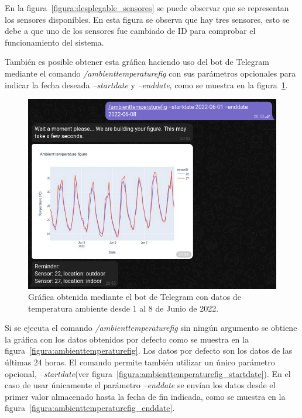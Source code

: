 \documentclass[a4paper, 12pt, oneside]{book}
\begin{document}
En la figura~\ref{figura:desplegable_sensores} se puede observar que se representan los sensores disponibles. En esta figura se observa que hay tres sensores, esto se debe a que uno de los sensores fue cambiado de ID para comprobar el funcionamiento del sistema.


También es posible obtener esta gráfica haciendo uso del bot de Telegram mediante el comando \textit{/ambienttemperaturefig} con sus parámetros opcionales para indicar la fecha deseada \textit{--startdate} y \textit{--enddate}, como se muestra en la figura~\ref{figura:telegram_ambient_temperature_01_08_junio}.
\begin{figure}[H]
	\centering
    \includegraphics[width=12cm, keepaspectratio]{img/telegram_ambient_temperature_01_08_junio}
    \caption{Gráfica obtenida mediante el bot de Telegram con datos de temperatura ambiente desde 1 al 8 de Junio de 2022.}
    \label{figura:telegram_ambient_temperature_01_08_junio}
\end{figure}

Si se ejecuta el comando \textit{/ambienttemperaturefig} sin ningún argumento se obtiene la gráfica con los datos obtenidos por defecto como se muestra en la figura~\ref{figura:ambienttemperaturefig}. Los datos por defecto son los datos de las últimas 24 horas. El comando permite también utilizar un único parámetro opcional, \textit{--startdate}(ver figura~\ref{figura:ambienttemperaturefig_startdate}). En el caso de usar únicamente el parámetro \textit{--enddate} se envían los datos desde el primer valor almacenado hasta la fecha de fin indicada, como se muestra en la figura~\ref{figura:ambienttemperaturefig_enddate}.
\end{document}
